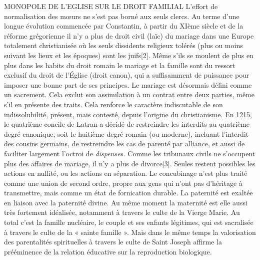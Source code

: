 MONOPOLE DE L'EGLISE SUR LE DROIT FAMILIAL 
 L'effort de normalisation des mœurs ne s'est pas borné aux seuls clercs. Au terme d'une longue évolution commencée par Constantin, à partir du XIème siècle et de la réforme grégorienne il n'y a plus de droit civil (laïc) du mariage dans une Europe totalement christianisée où les seuls dissidents religieux tolérés (plus ou moins suivant les lieux et les époques) sont les juifs[2]. Même s'ils se moulent de plus en plus dans les habits du droit romain le mariage et la famille sont du ressort exclusif du droit de l'Église (droit canon), qui a suffisamment de puissance pour imposer une bonne part de ses principes. 
 Le mariage est désormais défini comme un sacrement. Cela exclut son assimilation à un contrat entre deux parties, même s'il en présente des traits. Cela renforce le caractère indiscutable de son indissolubilité, présent, mais contesté, depuis l'origine du christianisme. 
 En 1215, le quatrième concile de Latran a décidé de restreindre les interdits au quatrième degré canonique, soit le huitième degré romain (ou moderne), incluant l'interdit des cousins germains, de restreindre les cas de parenté par alliance, et aussi de faciliter largement l'octroi de \emph{dispenses.} 
 Comme les tribunaux civils ne s'occupent plus des affaires de mariage, il n'y a plus de divorce[3]. Seules restent possibles les actions en nullité, ou les actions en séparation. Le concubinage n'est plus traité comme une union de second ordre, propre aux gens qui n'ont pas d'héritage à transmettre, mais comme un état de fornication durable.
 La paternité est exaltée en liaison avec la paternité divine. Au même moment la maternité est elle aussi très fortement idéalisée, notamment à travers le culte de la Vierge Marie. Au total c'est la famille nucléaire, le couple et ses enfants légitimes, qui est sacralisée à travers le culte de la « sainte famille ». Mais dans le même temps la valorisation des parentalités spirituelles à travers le culte de Saint Joseph affirme la prééminence de la relation éducative sur la reproduction biologique.

